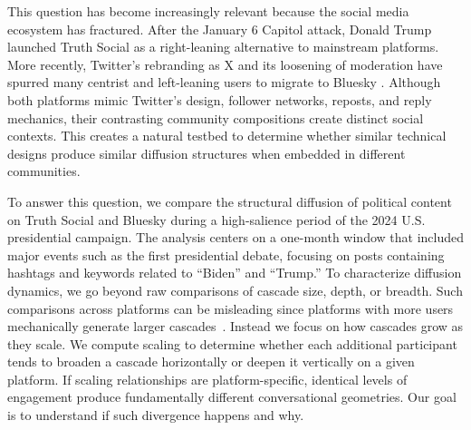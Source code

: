 \documentclass[letterpaper]{article} %
\begin{document}

This question has become increasingly relevant because the social media ecosystem has fractured. After the January 6 Capitol attack, Donald Trump launched Truth Social as a right-leaning alternative to mainstream platforms. More recently, Twitter's rebranding as X and its loosening of moderation have spurred many centrist and left-leaning users to migrate to Bluesky \cite{gerard_truth_2023, failla_im_2024, quelle_bluesky_2024}. Although both platforms mimic Twitter's design, follower networks, reposts, and reply mechanics, their contrasting community compositions create distinct social contexts. 
This creates a natural testbed to determine whether similar technical designs produce similar diffusion structures when embedded in different communities.

To answer this question, we compare the structural diffusion of political content on Truth Social and Bluesky during a high-salience period of the 2024 U.S. presidential campaign. The analysis centers on a one-month window that included major events such as the first presidential debate, focusing on posts containing hashtags and keywords related to ``Biden'' and ``Trump.'' 
To characterize diffusion dynamics, we go beyond raw comparisons of cascade size, depth, or breadth. Such comparisons across platforms can be misleading since platforms with more users mechanically generate larger cascades~\citep{juul_comparing_2021}. Instead we focus on how cascades grow as they scale. We compute scaling to determine whether each additional participant tends to broaden a cascade horizontally or deepen it vertically on a given platform. If scaling relationships are platform-specific, identical levels of engagement produce fundamentally different conversational geometries. Our goal is to understand if such divergence happens and why.
\end{document}

